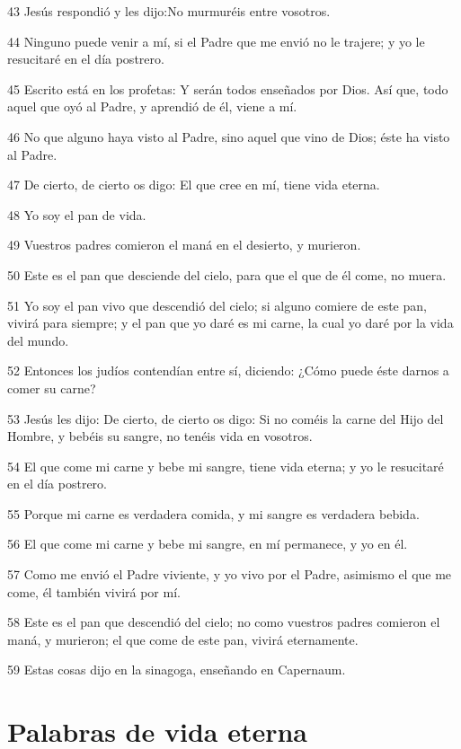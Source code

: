 \par 43 Jesús respondió y les dijo:No murmuréis entre vosotros.
\par 44 Ninguno puede venir a mí, si el Padre que me envió no le trajere; y yo le resucitaré en el día postrero.
\par 45 Escrito está en los profetas: Y serán todos enseñados por Dios. Así que, todo aquel que oyó al Padre, y aprendió de él, viene a mí.
\par 46 No que alguno haya visto al Padre, sino aquel que vino de Dios; éste ha visto al Padre.
\par 47 De cierto, de cierto os digo: El que cree en mí, tiene vida eterna.
\par 48 Yo soy el pan de vida.
\par 49 Vuestros padres comieron el maná en el desierto, y murieron.
\par 50 Este es el pan que desciende del cielo, para que el que de él come, no muera.
\par 51 Yo soy el pan vivo que descendió del cielo; si alguno comiere de este pan, vivirá para siempre; y el pan que yo daré es mi carne, la cual yo daré por la vida del mundo.
\par 52 Entonces los judíos contendían entre sí, diciendo: ¿Cómo puede éste darnos a comer su carne?
\par 53 Jesús les dijo: De cierto, de cierto os digo: Si no coméis la carne del Hijo del Hombre, y bebéis su sangre, no tenéis vida en vosotros.
\par 54 El que come mi carne y bebe mi sangre, tiene vida eterna; y yo le resucitaré en el día postrero.
\par 55 Porque mi carne es verdadera comida, y mi sangre es verdadera bebida.
\par 56 El que come mi carne y bebe mi sangre, en mí permanece, y yo en él.
\par 57 Como me envió el Padre viviente, y yo vivo por el Padre, asimismo el que me come, él también vivirá por mí.
\par 58 Este es el pan que descendió del cielo; no como vuestros padres comieron el maná, y murieron; el que come de este pan, vivirá eternamente.
\par 59 Estas cosas dijo en la sinagoga, enseñando en Capernaum.

\section*{Palabras de vida eterna}

